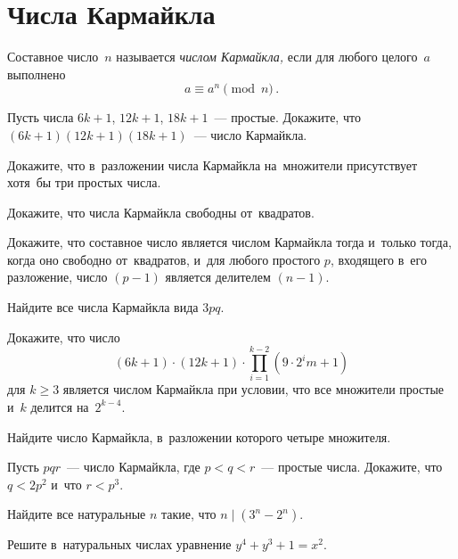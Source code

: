 
\section*{Числа Кармайкла}


\begingroup
    \providecommand\divides{\mathrel{\vert}}

Составное число~$n$ называется \emph{числом Кармайкла,} если для любого
целого~$a$ выполнено\enspace
\[
    a \equiv a^{n} \pmod{n}
\, . \]

\begin{problems}

\item
Пусть числа $6 k + 1$, $12 k + 1$, $18 k + 1$~--- простые.
Докажите, что $(6 k + 1) (12 k + 1)(18 k + 1)$~--- число Кармайкла.

\item
Докажите, что в~разложении числа Кармайкла на~множители присутствует хотя~бы
три простых числа.

\item
Докажите, что числа Кармайкла свободны от~квадратов.

\item
Докажите, что составное число является числом Кармайкла тогда и~только тогда,
когда оно свободно от~квадратов, и~для любого простого $p$, входящего в~его
разложение, число $(p - 1)$ является делителем $(n - 1)$.

\item
Найдите все числа Кармайкла вида $3 p q$.

\item
Докажите, что число
\[
    (6 k + 1) \cdot (12 k + 1) \cdot
    \prod_{i=1}^{k-2}
        (9 \cdot 2^i m + 1)
\]
для $k \geq 3$ является числом Кармайкла при условии, что все множители простые
и~$k$ делится на~$2^{k-4}$.

\item
Найдите число Кармайкла, в~разложении которого четыре множителя.

\item
Пусть $p q r$~--- число Кармайкла, где $p < q < r$~--- простые числа.
Докажите, что $q < 2 p^2$ и~что $r < p^3$.

\item
Найдите все натуральные $n$ такие, что $n \divides (3^n - 2^n)$.

\item
Решите в~натуральных числах уравнение $y^4 + y^3 + 1 = x^2$.

\end{problems}

\endgroup %

